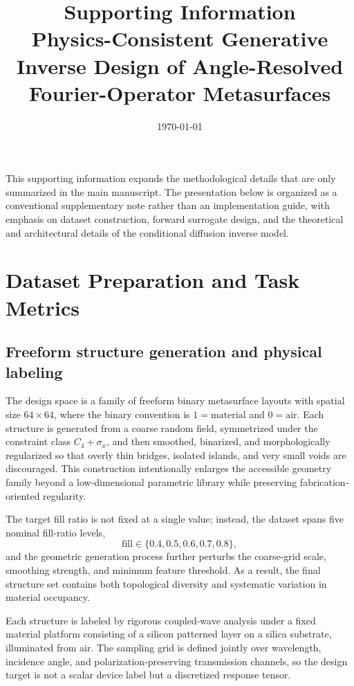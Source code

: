 \documentclass[10pt,a4paper]{article}
\begin{document}
\title{Supporting Information\\[0.4em]\large Physics-Consistent Generative Inverse Design of Angle-Resolved Fourier-Operator Metasurfaces}
\author{}
\date{\today}
\maketitle

This supporting information expands the methodological details that are only summarized in the main manuscript. The presentation below is organized as a conventional supplementary note rather than an implementation guide, with emphasis on dataset construction, forward surrogate design, and the theoretical and architectural details of the conditional diffusion inverse model.

\section{Dataset Preparation and Task Metrics}

\subsection{Freeform structure generation and physical labeling}

The design space is a family of freeform binary metasurface layouts with spatial size $64\times 64$, where the binary convention is $1=\mathrm{material}$ and $0=\mathrm{air}$. Each structure is generated from a coarse random field, symmetrized under the constraint class $C_4+\sigma_x$, and then smoothed, binarized, and morphologically regularized so that overly thin bridges, isolated islands, and very small voids are discouraged. This construction intentionally enlarges the accessible geometry family beyond a low-dimensional parametric library while preserving fabrication-oriented regularity.

The target fill ratio is not fixed at a single value; instead, the dataset spans five nominal fill-ratio levels,
\begin{equation}
\mathrm{fill}\in\{0.4,0.5,0.6,0.7,0.8\},
\end{equation}
and the geometric generation process further perturbs the coarse-grid scale, smoothing strength, and minimum feature threshold. As a result, the final structure set contains both topological diversity and systematic variation in material occupancy.

Each structure is labeled by rigorous coupled-wave analysis under a fixed material platform consisting of a silicon patterned layer on a silica substrate, illuminated from air. The sampling grid is defined jointly over wavelength, incidence angle, and polarization-preserving transmission channels, so the design target is not a scalar device label but a discretized response tensor.
\end{document}

